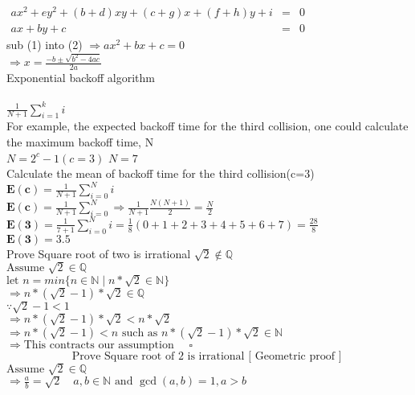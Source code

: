 \documentclass[10pt]{article}
\begin{document}
\noindent
$
\begin{array}{lcl}
ax^{2} + ey^{2} + (b+d)xy + (c+g)x + (f+h)y + i &=& 0\\
ax + by + c &=& 0
\end{array}
$\\
sub (1) into (2) 
$\Rightarrow ax^{2} + bx + c = 0$\\
$\Rightarrow x = \frac{-b \pm \sqrt{b^{2} - 4ac}}{2a}$
\\

Exponential backoff algorithm\\
\\
$\frac{1}{N+1} \sum_{i=1}^{k}i$\\
For example, the expected backoff time for the third collision, one could 
calculate the maximum backoff time, N\\
$N = 2^{c} - 1 (c = 3)$
$N = 7$\\
Calculate the mean of backoff time for the third collision(c=3)\\
$\mathbf{E(c)} = \frac{1}{N+1}\sum_{i=0}^{N} i$\\
$\mathbf{E(c)} = \frac{1}{N+1}\sum_{i=0}^{N} \Rightarrow \frac{1}{N+1} \frac{N(N+1)}{2} = \frac{N}{2}$\\
$\mathbf{E(3)} = \frac{1}{7+1}\sum_{i=0}^{N} i = \frac{1}{8}(0+1+2+3+4+5+6+7) = \frac{28}{8}$\\
$\mathbf{E(3)} = 3.5$\\

Prove Square root of two is irrational
$\sqrt{2} \notin \mathbb{Q}$\\
$\text{Assume } \sqrt{2} \in \mathbb{Q}$\\
$\text{let }n = min\{ n \in \mathbb{N} \mid n*\sqrt{2} \in \mathbb{N}\}$\\
$\Rightarrow n*(\sqrt{2} - 1)*\sqrt{2} \in \mathbb{Q}$\\
$\because \sqrt{2} - 1 < 1$\\
$\Rightarrow n*(\sqrt{2} - 1)*\sqrt{2} < n*\sqrt{2}$\\
$\Rightarrow n*(\sqrt{2} - 1) < n \text{ such as } n*(\sqrt{2} - 1)*\sqrt{2} \in \mathbb{N}$\\
$\Rightarrow \text{This contracts our assumption } \quad \square$\\

\pagebreak
\noindent
\[ \text{Prove Square root of 2 is irrational} \text{ [ Geometric proof ] }\]
$\text{Assume } \sqrt{2} \in \mathbb{Q}$\\
$\Rightarrow \frac{a}{b} = \sqrt{2} \quad a, b \in \mathbb{N} \text{ and } \gcd(a, b) = 1, a > b$\\
\end{document}
